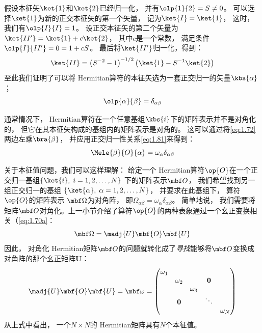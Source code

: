 \begin{enumerate}[]
 假设本征矢$\ket{1}$和$\ket{2}$已经归一化，
 并有$\olp{1}{2} = S \neq 0$。
 可以选择$\ket{1}$为新的正交本征矢的第一个矢量，
 记为$\ket{I} = \ket{1}$，
 这时，我们有$\olp{I}{I} = 1$。
 设正交本征矢的第二个矢量为$\ket{II^\prime} = \ket{1} + c\ket{2}$，
 其中$c$是一个常数，
 满足条件$\olp{I}{II^\prime} = 0 = 1+cS$。
 最后将$\ket{II^\prime}$归一化，得到：
 \begin{equation}
     \ket{II} = \left(S^{-2}-1\right)^{-1/2}\left(\ket{1}-S^{-1}\ket{2}\right)
     \label{eq:1.80}
 \end{equation}
 至此我们证明了可以将 Hermitian算符的本征矢选为一套正交归一的矢量$\kbs{\alpha}$；
 \begin{equation}
     \olp{\alpha}{\beta} = \delta_{\alpha\beta}
     \label{eq:1.81}
 \end{equation}
\end{enumerate}

通常情况下，
Hermitian算符在一个任意基组$\kbs{i}$下的矩阵表示并不是对角化的，
但它在其本征矢构成的基组内的矩阵表示是对角的。
这可以通过将\autoref{eq:1.72}两边左乘$\bra{\beta}$，
并应用正交归一性关系\autoref{eq:1.81}来得到：
\begin{equation}
 \Mele{\beta}{O}{\alpha} = \omega_\alpha\delta_{\alpha\beta}
 \label{eq:1.82}
\end{equation}

关于本征值问题，我们可以这样理解：
给定一个 Hermitian算符$\op{O}$在一个正交归一基组$\left\{\ket{i},\; i = 1, 2, \dots, N\right\}$ 下的矩阵表示$\mbf O$，
我们希望找到另一组正交归一的基组 $\left\{\ket{\alpha},\; \alpha = 1, 2, \dots, N\right\}$，
并要求在此基组下，
算符$\op{O}$的矩阵表示 $\mbf\Omega$为对角阵，
即$\Omega_{\alpha\beta} = \omega_\alpha\delta_{\alpha\beta}$。
简单地说，
我们需要将矩阵$\mbf O$对角化。上一小节介绍了算符$\op{O}$的两种表象通过一个幺正变换相关（\autoref{eq:1.70a}：
\[\mbf\Omega = \madj{U}\mbf{O}\mbf{U}\]
因此，
对角化 Hermitian矩阵$\mbf O$的问题就转化成了\emph{寻找}能够将$\mbf O$变换成对角阵的那个幺正矩阵$\mathbf{U}$：
\begin{equation}
 \madj{U}\mbf{O}\mbf{U} = \mbf\omega = \begin{pmatrix}
     \omega_1     & & & &\\
          &\omega_2 &     &\mathbf{0} &\\
          & &\omega_3 & &\\
          &\mathbf{0} & & \ddots & \\
          & &     & &\omega_N
 \end{pmatrix}
 \label{eq:1.83}
\end{equation}
从上式中看出，
一个$N\times N$的 Hermitian矩阵具有$N$个本征值。


